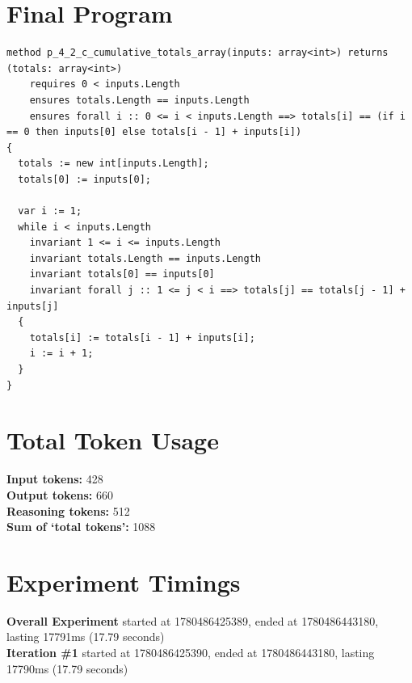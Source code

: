 \documentclass{article}
\begin{document}
\section*{Final Program}
\begin{lstlisting}
method p_4_2_c_cumulative_totals_array(inputs: array<int>) returns (totals: array<int>)
	requires 0 < inputs.Length
	ensures totals.Length == inputs.Length
	ensures forall i :: 0 <= i < inputs.Length ==> totals[i] == (if i == 0 then inputs[0] else totals[i - 1] + inputs[i])
{
  totals := new int[inputs.Length];
  totals[0] := inputs[0];

  var i := 1;
  while i < inputs.Length
    invariant 1 <= i <= inputs.Length
    invariant totals.Length == inputs.Length
    invariant totals[0] == inputs[0]
    invariant forall j :: 1 <= j < i ==> totals[j] == totals[j - 1] + inputs[j]
  {
    totals[i] := totals[i - 1] + inputs[i];
    i := i + 1;
  }
}
\end{lstlisting}
\section*{Total Token Usage}
\textbf{Input tokens: }428
\\\textbf{Output tokens: }660
\\\textbf{Reasoning tokens: }512
\\\textbf{Sum of `total tokens': }1088
\section*{Experiment Timings}
\textbf{Overall Experiment} started at 1780486425389, ended at 1780486443180, lasting 17791ms (17.79 seconds)
\\\textbf{Iteration \#1} started at 1780486425390, ended at 1780486443180, lasting 17790ms (17.79 seconds)
\end{document}
